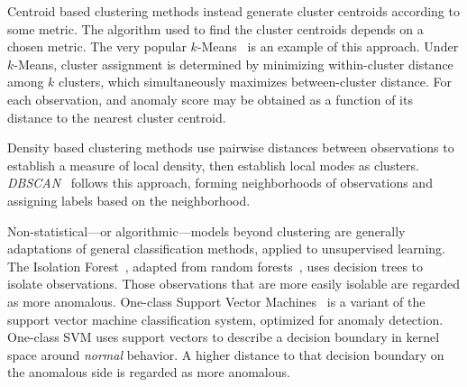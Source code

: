 Centroid based clustering methods instead generate cluster centroids 
    according to some metric.  The algorithm used to find the cluster centroids 
    depends on a chosen metric.  The very popular $k$-Means~\citep{hartigan1979} 
    is an example of this approach. Under $k$-Means, cluster assignment is 
    determined by minimizing within-cluster distance among $k$ clusters, which 
    simultaneously maximizes between-cluster distance. For each observation, 
    and anomaly score may be obtained as a function of its distance to the 
    nearest cluster centroid.  
    
Density based clustering methods use pairwise distances between observations to 
    establish a measure of local density, then establish local modes as 
    clusters.  \emph{DBSCAN}~\citep{ester1996} follows this approach, forming 
    neighborhoods of observations and assigning labels based on the 
    neighborhood. 
    
Non-statistical---or algorithmic---models beyond clustering are generally adaptations 
    of general classification methods, applied to unsupervised learning.  
    The Isolation Forest~\citep{liu2000}, adapted from random 
    forests~\citep{breiman2001}, uses decision trees to isolate observations.
    Those observations that are more easily isolable are regarded as more 
    anomalous.  One-class Support Vector Machines~\citep{chang2011} is a variant
    of the support vector machine classification system, optimized for 
    anomaly detection.  One-class SVM uses support vectors to describe a 
    decision boundary in kernel space around \emph{normal} behavior. A higher 
    distance to that decision boundary on the anomalous side is regarded as 
    more anomalous.

    
